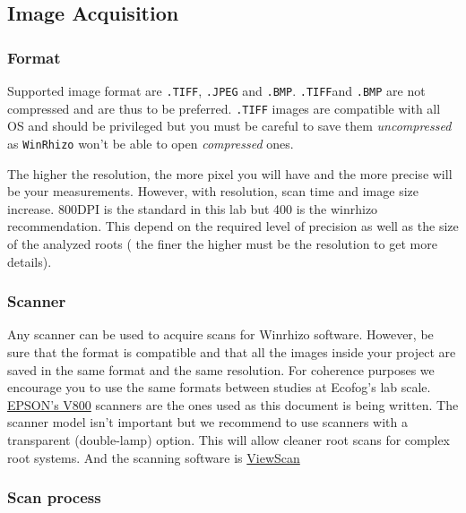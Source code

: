 \documentclass[
  12pt,
  american,
  a4paper,
  extrafontsizes,onecolumn,openright
  ]{memoir}
\begin{document}
\hypertarget{image-acquisition}{%
\subsection{Image Acquisition}\label{image-acquisition}}

\hypertarget{format}{%
\subsubsection{Format}\label{format}}

Supported image format are \texttt{.TIFF}, \texttt{.JPEG} and \texttt{.BMP}. \texttt{.TIFF}and \texttt{.BMP} are not compressed and are thus to be preferred. \texttt{.TIFF} images are compatible with all OS and should be privileged but you must be careful to save them \emph{uncompressed} as \texttt{WinRhizo} won't be able to open \emph{compressed} ones.

The higher the resolution, the more pixel you will have and the more precise will be your measurements. However, with resolution, scan time and image size increase. 800DPI is the standard in this lab but 400 is the winrhizo recommendation. This depend on the required level of precision as well as the size of the analyzed roots ( the finer the higher must be the resolution to get more details).

\hypertarget{scanner}{%
\subsubsection{Scanner}\label{scanner}}

Any scanner can be used to acquire scans for Winrhizo software. However, be sure that the format is compatible and that all the images inside your project are saved in the same format and the same resolution. For coherence purposes we encourage you to use the same formats between studies at Ecofog's lab scale.
\href{document/machine/EPSON_V800/test.txt}{EPSON's V800} scanners are the ones used as this document is being written. The scanner model isn't important but we recommend to use scanners with a transparent (double-lamp) option. This will allow cleaner root scans for complex root systems.
And the scanning software is \href{document/software/Viewscan/test.txt}{ViewScan}

\hypertarget{scan-process}{%
\subsubsection{Scan process}\label{scan-process}}
\end{document}
